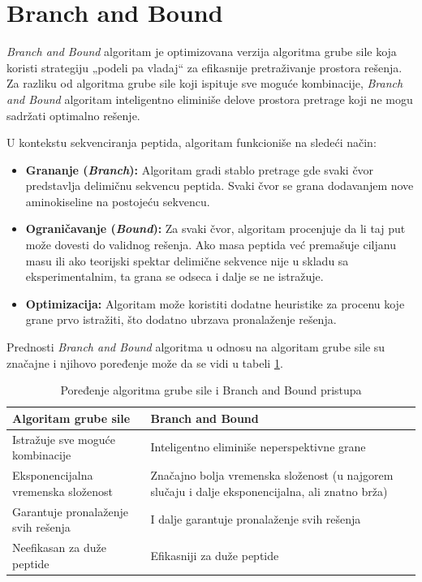 \documentclass[12pt,oneside]{memoir}
\begin{document}
\section{Branch and Bound}
\emph{Branch and Bound} algoritam \cite{online_lecture, online_book} je optimizovana verzija algoritma grube sile koja koristi strategiju „podeli pa vladaj“ za efikasnije pretraživanje prostora rešenja. Za razliku od algoritma grube sile koji ispituje sve moguće kombinacije, \emph{Branch and Bound} algoritam inteligentno eliminiše delove prostora pretrage koji ne mogu sadržati optimalno rešenje.

U kontekstu sekvenciranja peptida, algoritam funkcioniše na sledeći način:
\begin{itemize}
    \item \textbf{Grananje (\emph{Branch}):} Algoritam gradi stablo pretrage gde svaki čvor predstavlja delimičnu sekvencu peptida. Svaki čvor se grana dodavanjem nove aminokiseline na postojeću sekvencu.
    \item \textbf{Ograničavanje (\emph{Bound}):} Za svaki čvor, algoritam procenjuje da li taj put može dovesti do validnog rešenja. Ako masa peptida već premašuje ciljanu masu ili ako teorijski spektar delimične sekvence nije u skladu sa eksperimentalnim, ta grana se odseca i dalje se ne istražuje.
    \item \textbf{Optimizacija:} Algoritam može koristiti dodatne heuristike za procenu koje grane prvo istražiti, što dodatno ubrzava pronalaženje rešenja.
\end{itemize}

Prednosti \emph{Branch and Bound} algoritma u odnosu na algoritam grube sile su značajne i njihovo poređenje može da se vidi u tabeli \ref{tab:branch_vs_brute}.

\begin{table}[H]
\centering
\renewcommand{\arraystretch}{1.5}
\begin{tabular}{|>{\raggedright\arraybackslash}m{}|>{\raggedright\arraybackslash}m{}|}
\hline
\textbf{Algoritam grube sile} & \textbf{Branch and Bound} \\
\hline
Istražuje sve moguće kombinacije & Inteligentno eliminiše neperspektivne grane \\
\hline
Eksponencijalna vremenska složenost & Značajno bolja vremenska složenost (u najgorem slučaju i dalje eksponencijalna, ali znatno brža) \\
\hline
Garantuje pronalaženje svih rešenja & I dalje garantuje pronalaženje svih rešenja \\
\hline
Neefikasan za duže peptide & Efikasniji za duže peptide \\
\hline
\end{tabular}
\caption{Poređenje algoritma grube sile i Branch and Bound pristupa}
\label{tab:branch_vs_brute}
\end{table}
\end{document}
